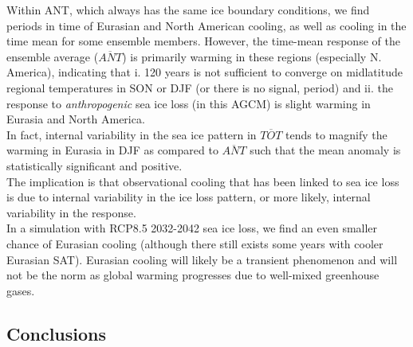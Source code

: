\documentclass[twocol]{ametsoc}
\begin{document}
Within ANT, which always has the same ice boundary conditions, we find periods in time of Eurasian and North American cooling, as well as cooling in the time mean for some ensemble members. However, the time-mean response of the ensemble average ($\overline{ANT}$) is primarily warming in these regions (especially N. America), indicating that i. 120 years is not sufficient to converge on midlatitude regional temperatures in SON or DJF (or there is no signal, period) and ii. the response to \textit{anthropogenic} sea ice loss (in this AGCM) is slight warming in Eurasia and North America. \\
In fact, internal variability in the sea ice pattern in $\overline{TOT}$ tends to magnify the warming in Eurasia in DJF as compared to $\overline{ANT}$ such that the mean anomaly is statistically significant and positive.\\
The implication is that observational cooling that has been linked to sea ice loss is due to internal variability in the ice loss pattern, or more likely, internal variability in the response. \\

In a simulation with RCP8.5 2032-2042 sea ice loss, we find an even smaller chance of Eurasian cooling (although there still exists some years with cooler Eurasian SAT). Eurasian cooling will likely be a transient phenomenon and will not be the norm as global warming progresses due to well-mixed greenhouse gases. %

\subsection{Conclusions}
\end{document}
